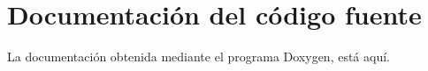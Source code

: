

\section{Documentación del código fuente}

La documentación obtenida mediante el programa Doxygen, está aquí.